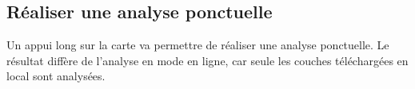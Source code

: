 \documentclass[12pt,a4paper]{report}
\begin{document}
\subsection{Réaliser une analyse ponctuelle}

Un appui long sur la carte va permettre de réaliser une analyse ponctuelle. Le résultat diffère de l'analyse en mode en ligne, car seule les couches téléchargées en local sont analysées.
\fi

\end{document}
